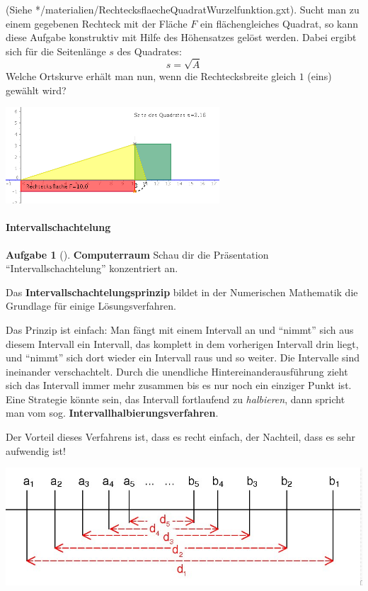 \documentclass[a4paper, twoside, parskip, 10pt, smallheadings]{scrbook}
\theoremstyle{plain}
\theoremstyle{definition}
\newtheorem{Auf}{Aufgabe}%
\newenvironment{fshaded}{%
\def\FrameCommand{\fcolorbox{framecolor}{shadecolor}}%
\MakeFramed {\FrameRestore}}%
{\endMakeFramed}
\newenvironment{fauf}[1][]{\definecolor{shadecolor}{rgb}{.58,.788,1}%
\definecolor{framecolor}{rgb}{.13,.25,.9}%
\begin{fshaded}\begin{Auf}[#1]}{\end{Auf}\end{fshaded}}
\newcommand{\ba}{\begin{fauf}}
\newcommand{\ea}{\end{fauf}}
\begin{document}
\begin{minipage}{7cm}
(Siehe */materialien/RechtecksflaecheQuadratWurzelfunktion.gxt). Sucht man zu einem gegebenen Rechteck mit der Fläche $F$ ein flächengleiches Quadrat, so kann diese Aufgabe konstruktiv mit Hilfe des Höhensatzes gelöst werden. Dabei ergibt sich für die Seitenlänge $s$ des Quadrates: $$s=\sqrt{A}$$
Welche Ortskurve erhält man nun, wenn die Rechtecksbreite gleich $1$ (eins) gewählt wird?
\end{minipage}
\begin{minipage}{8cm}
\includegraphics[width=8cm]{2te/reellezahlen/bilder/rechtecksflaeche.png}
\end{minipage}

\paragraph{Intervallschachtelung}
\ba {\bf Computerraum} Schau dir die Präsentation "`Intervallschachtelung"' konzentriert an.\ea

Das {\bf Intervallschachtelungsprinzip} bildet in der Numerischen Mathematik die Grundlage für einige Lösungsverfahren.

Das Prinzip ist einfach: Man fängt mit einem Intervall an und "`nimmt"' sich aus diesem Intervall ein Intervall, das komplett in dem vorherigen Intervall drin liegt, und "`nimmt"' sich dort wieder ein Intervall raus und so weiter. Die Intervalle sind ineinander verschachtelt. Durch die unendliche Hintereinanderausführung zieht sich das Intervall immer mehr zusammen bis es nur noch ein einziger Punkt ist.  Eine Strategie könnte sein, das Intervall fortlaufend zu {\it halbieren}, dann spricht man vom sog. {\bf Intervallhalbierungsverfahren}.

Der Vorteil dieses Verfahrens ist, dass es recht einfach, der Nachteil, dass es sehr aufwendig ist!
	\begin{center}
	\includegraphics[width=14cm,bb=0 0 829 273]{2te/reellezahlen/bilder/intervallschachtelung1.jpg}
	\end{center}
\end{document}
